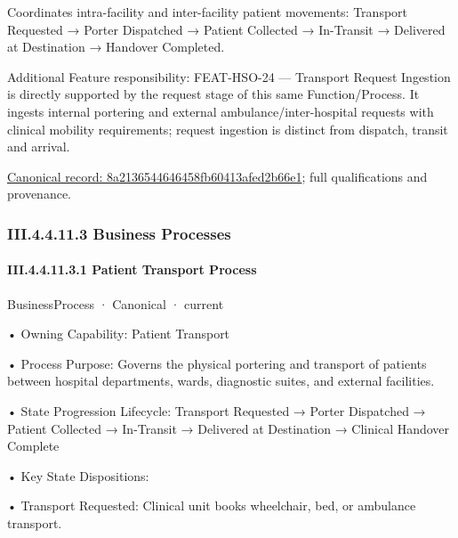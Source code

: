 Coordinates intra-facility and inter-facility patient movements: Transport Requested → Porter Dispatched → Patient Collected → In-Transit → Delivered at Destination → Handover Completed.



Additional Feature responsibility: FEAT-HSO-24 — Transport Request Ingestion is directly supported by the request stage of this same Function/Process. It ingests internal portering and external ambulance/inter-hospital requests with clinical mobility requirements; request ingestion is distinct from dispatch, transit and arrival.


{\footnotesize \href{../../../../continuum/business/business-function/8a2136544646458fb60413afed2b66e1.md}{Canonical record: 8a2136544646458fb60413afed2b66e1}; full qualifications and provenance.}\par
\subsubsection*{III.4.4.11.3 Business Processes}
\label{navigation:III.4.4.11.3}

\paragraph*{III.4.4.11.3.1 Patient Transport Process}
\label{navigation:III.4.4.11.3.1}

\label{element:f2e58fd18cd94b0faaa364d3890a7c9e}
{\small BusinessProcess · Canonical · current}\par

•
Owning Capability: Patient Transport



•
Process Purpose: Governs the physical portering and transport of patients between hospital departments, wards, diagnostic suites, and external facilities.



•
State Progression Lifecycle: Transport Requested → Porter Dispatched → Patient Collected → In-Transit → Delivered at Destination → Clinical Handover Complete



•
Key State Dispositions:



•
Transport Requested: Clinical unit books wheelchair, bed, or ambulance transport.



